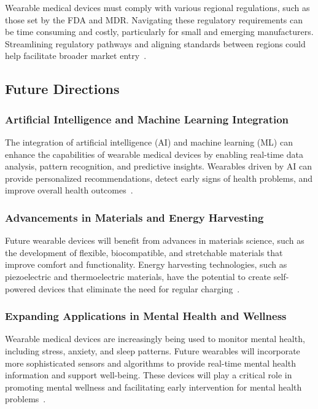 \documentclass[journal]{IEEEtran}
\begin{document}
        Wearable medical devices must comply with various regional regulations, such as those set by the FDA and MDR. Navigating these regulatory requirements can be time consuming and costly, particularly for small and emerging manufacturers. Streamlining regulatory pathways and aligning standards between regions could help facilitate broader market entry~\cite{Ravizza2019}.

    \subsection{Future Directions}

        \subsubsection{Artificial Intelligence and Machine Learning Integration}

        The integration of artificial intelligence (AI) and machine learning (ML) can enhance the capabilities of wearable medical devices by enabling real-time data analysis, pattern recognition, and predictive insights. Wearables driven by AI can provide personalized recommendations, detect early signs of health problems, and improve overall health outcomes~\cite{Nahavandi2022}.

        \subsubsection{Advancements in Materials and Energy Harvesting}

        Future wearable devices will benefit from advances in materials science, such as the development of flexible, biocompatible, and stretchable materials that improve comfort and functionality. Energy harvesting technologies, such as piezoelectric and thermoelectric materials, have the potential to create self-powered devices that eliminate the need for regular charging~\cite{Pantrangi2024}.

        \subsubsection{Expanding Applications in Mental Health and Wellness}

        Wearable medical devices are increasingly being used to monitor mental health, including stress, anxiety, and sleep patterns. Future wearables will incorporate more sophisticated sensors and algorithms to provide real-time mental health information and support well-being. These devices will play a critical role in promoting mental wellness and facilitating early intervention for mental health problems~\cite{Iqbal2016}.
\end{document}
